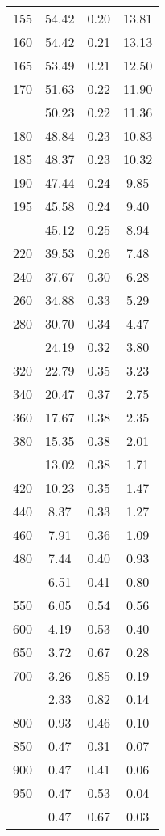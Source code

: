 \begin{table}[ht]
\begin{tabular}{lccc}
  155 & 54.42 & 0.20 & 13.81 \\ 
  160 & 54.42 & 0.21 & 13.13 \\ 
  165 & 53.49 & 0.21 & 12.50 \\ 
  170 & 51.63 & 0.22 & 11.90 \\ 
   \addlinespace
175 & 50.23 & 0.22 & 11.36 \\ 
  180 & 48.84 & 0.23 & 10.83 \\ 
  185 & 48.37 & 0.23 & 10.32 \\ 
  190 & 47.44 & 0.24 & 9.85 \\ 
  195 & 45.58 & 0.24 & 9.40 \\ 
   \addlinespace
200 & 45.12 & 0.25 & 8.94 \\ 
  220 & 39.53 & 0.26 & 7.48 \\ 
  240 & 37.67 & 0.30 & 6.28 \\ 
  260 & 34.88 & 0.33 & 5.29 \\ 
  280 & 30.70 & 0.34 & 4.47 \\ 
   \addlinespace
300 & 24.19 & 0.32 & 3.80 \\ 
  320 & 22.79 & 0.35 & 3.23 \\ 
  340 & 20.47 & 0.37 & 2.75 \\ 
  360 & 17.67 & 0.38 & 2.35 \\ 
  380 & 15.35 & 0.38 & 2.01 \\ 
   \addlinespace
400 & 13.02 & 0.38 & 1.71 \\ 
  420 & 10.23 & 0.35 & 1.47 \\ 
  440 & 8.37 & 0.33 & 1.27 \\ 
  460 & 7.91 & 0.36 & 1.09 \\ 
  480 & 7.44 & 0.40 & 0.93 \\ 
   \addlinespace
500 & 6.51 & 0.41 & 0.80 \\ 
  550 & 6.05 & 0.54 & 0.56 \\ 
  600 & 4.19 & 0.53 & 0.40 \\ 
  650 & 3.72 & 0.67 & 0.28 \\ 
  700 & 3.26 & 0.85 & 0.19 \\ 
   \addlinespace
750 & 2.33 & 0.82 & 0.14 \\ 
  800 & 0.93 & 0.46 & 0.10 \\ 
  850 & 0.47 & 0.31 & 0.07 \\ 
  900 & 0.47 & 0.41 & 0.06 \\ 
  950 & 0.47 & 0.53 & 0.04 \\ 
   \addlinespace
1000 & 0.47 & 0.67 & 0.03 \\ 
   \bottomrule
\end{tabular}
\end{table}
